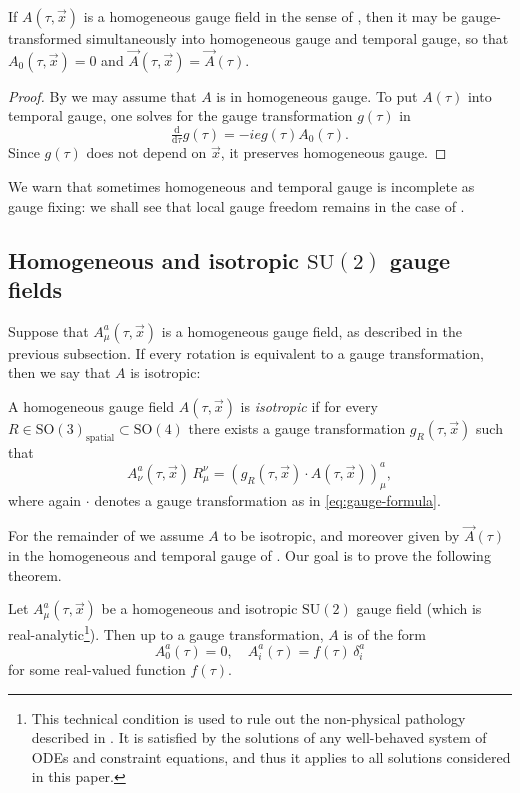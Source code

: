\begin{thm}
\label{thm:hom-temp-gauge}If $A(\tau,\vec{x})$ is a homogeneous gauge field in the sense of , then it may be gauge-transformed simultaneously into homogeneous gauge and temporal gauge, so that $A_{0}(\tau,\vec{x})=0$ and $\vec{A}(\tau,\vec{x})=\vec{A}(\tau)$. 
\end{thm}

\begin{proof}
By  we may assume that $A$ is in homogeneous gauge. To put $A(\tau)$ into temporal gauge, one solves for the gauge transformation $g(\tau)$ in 
\[
\tfrac{\mathrm{d}}{\mathrm{d}\tau}g(\tau)=-ieg(\tau)A_{0}(\tau).
\]
 Since $g(\tau)$ does not depend on $\vec{x}$, it preserves homogeneous gauge.
\end{proof}
We warn that sometimes homogeneous and temporal gauge is incomplete as gauge fixing: we shall see that local gauge freedom remains in the case of . 

\subsection{\label{app:iso-gauge}Homogeneous and isotropic \texorpdfstring{$\mathrm{SU}(2)$}{SU(2)} gauge fields}

Suppose that $A_{\mu}^{a}(\tau,\vec{x})$ is a homogeneous gauge field, as described in the previous subsection. If every rotation is equivalent to a gauge transformation, then we say that $A$ is isotropic:
\begin{defn}
\label{def:isotropic-gf}A homogeneous gauge field $A(\tau,\vec{x})$ is \emph{isotropic} if for every $R\in\mathrm{SO}(3)_{\mathrm{spatial}}\subset\mathrm{SO}(4)$ there exists a gauge transformation $g_{R}(\tau,\vec{x})$ such that 
\begin{equation}
A_{\nu}^{a}(\tau,\vec{x})\,R_{\mu}^{\nu}=\left(g_{R}(\tau,\vec{x})\cdot A(\tau,\vec{x})\right)_{\mu}^{a},\label{eq:iso-gt}
\end{equation}
 where again $\cdot$ denotes a gauge transformation as in \eqref{eq:gauge-formula}. 
\end{defn}

For the remainder of  we assume $A$ to be isotropic, and moreover given by $\vec{A}(\tau)$ in the homogeneous and temporal gauge of . Our goal is to prove the following theorem. 
\begin{thm}
\label{thm:isotropy}Let $A_{\mu}^{a}(\tau,\vec{x})$ be a homogeneous and isotropic $\mathrm{SU}(2)$ gauge field (which is real-analytic\footnote{This technical condition is used to rule out the non-physical pathology described in . It is satisfied by the solutions of any well-behaved system of ODEs and constraint equations, and thus it applies to all solutions considered in this paper. }). Then up to a gauge transformation, $A$ is of the form 
\begin{equation}
A_{0}^{a}(\tau)=0,\quad A_{i}^{a}(\tau)=f(\tau)\,\delta_{i}^{a}\label{eq:iso-diag}
\end{equation}
 for some real-valued function $f(\tau)$. 
\end{thm}


